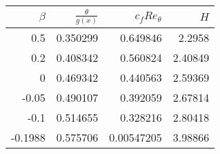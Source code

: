 \begin{tabular}{rrrr}
\hline
   $\beta$ &   $\frac{\theta}{g(x)}$ &   $c_f Re_{\theta}$ &     $H$ \\
\hline
    0.5    &                0.350299 &          0.649846   & 2.2958  \\
    0.2    &                0.408342 &          0.560824   & 2.40849 \\
    0      &                0.469342 &          0.440563   & 2.59369 \\
   -0.05   &                0.490107 &          0.392059   & 2.67814 \\
   -0.1    &                0.514655 &          0.328216   & 2.80418 \\
   -0.1988 &                0.575706 &          0.00547205 & 3.98866 \\
\hline
\end{tabular}